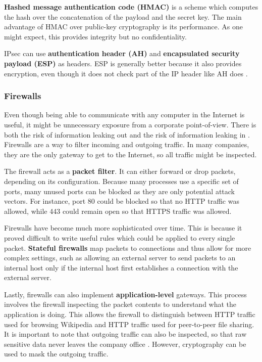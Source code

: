 \textbf{Hashed message authentication code (HMAC)} is a scheme which computes the hash over the concatenation of the payload and the secret key.
The main advantage of HMAC over public-key cryptography is its performance. As one might expect, this provides integrity but no confidentiality.

IPsec can use \textbf{authentication header (AH)} and \textbf{encapsulated security payload (ESP)} as headers.
ESP is generally better because it also provides encryption, even though it does not check part of the IP header like AH does \cite[p.~818]{computer-networks-tanenbaum-2012}.

\subsubsection{Firewalls}

Even though being able to communicate with any computer in the Internet is useful, it might be unnecessary exposure from a corporate point-of-view.
There is both the risk of information leaking out and the risk of information leaking in \cite[p.~818]{computer-networks-tanenbaum-2012}.
Firewalls are a way to filter incoming and outgoing traffic. In many companies, they are the only gateway to get to the Internet, so all traffic might be inspected.

The firewall acts as a \textbf{packet filter}. It can either forward or drop packets, depending on its configuration.
Because many processes use a specific set of ports, many unused ports can be blocked as they are only potential attack vectors.
For instance, port 80 could be blocked so that no HTTP traffic was allowed, while 443 could remain open so that HTTPS traffic was allowed.

Firewalls have become much more sophisticated over time. This is because it proved difficult to write useful rules which could be applied to every single packet.
\textbf{Stateful firewalls} map packets to connections and thus allow for more complex settings, such as allowing an external server to send packets to an internal host only if the internal host first establishes a connection with the external server.

Lastly, firewalls can also implement \textbf{application-level} gateways.
This process involves the firewall inspecting the packet contents to understand what the application is doing.
This allows the firewall to distinguish between HTTP traffic used for browsing Wikipedia and HTTP traffic used for peer-to-peer file sharing.
It is important to note that outgoing traffic can also be inspected, so that raw sensitive data never leaves the company office \cite[p.~819]{computer-networks-tanenbaum-2012}.
However, cryptography can be used to mask the outgoing traffic.

